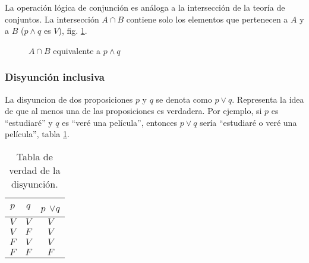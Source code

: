 La operación lógica de conjunción es análoga a la intersección de la teoría de conjuntos. La intersección $A \cap B$ contiene solo los elementos que pertenecen a $A$ y a $B$ ($p \land q$ es $V$), fig. \ref{fig:conjuncion}.

\begin{figure}[h]
	\centering
{}
\caption{$A \cap B$ equivalente a $p \land q$}
\label{fig:conjuncion}
\end{figure}

\subsubsection{Disyunción inclusiva } 
La \gls{disyuncion} de dos proposiciones $p$ y $q$ se denota como $p \lor q$. Representa la idea de que al menos una de las proposiciones es verdadera. Por ejemplo, si $p$ es ``estudiaré'' y $q$ es ``veré una película'', entonces $p \lor q$ sería ``estudiaré o veré una película'', tabla \ref{tab:disyuncion}.

\begin{table}[H]
	\centering
	\begin{tabular}{|c|c|c|} \hline
		 $p$ & $q$ & $p$ $\lor q$ \\ \hline
		 $V$ & $V$ & $V$ \\
		 $V$ & $F$ & $V$ \\
		 $F$ & $V$ & $V$ \\
		 $F$ & $F$ & $F$ \\ \hline
	\end{tabular}
	\caption{Tabla de verdad de la disyunción.}
	\label{tab:disyuncion}
\end{table}


